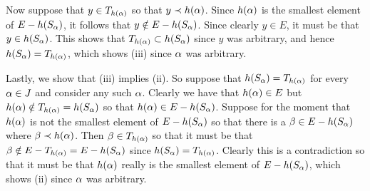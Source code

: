 {{    Now suppose that $y \in T_{h(\alpha)}$ so that $y \prec h(\alpha)$.
    Since $h(\alpha)$ is the smallest element of $E - h(S_\alpha)$, it follows that $y \notin E - h(S_\alpha)$.
    Since clearly $y \in E$, it must be that $y \in h(S_\alpha)$.
    This shows that $T_{h(\alpha)} \subset h(S_\alpha)$ since $y$ was arbitrary, and hence $h(S_\alpha) = T_{h(\alpha)}$, which shows (iii) since $\alpha$ was arbitrary.

    Lastly, we show that (iii) implies (ii).
    So suppose that $h(S_\alpha) = T_{h(\alpha)}$ for every $\alpha \in J$ and consider any such $\alpha$.
    Clearly we have that $h(\alpha) \in E$ but $h(\alpha) \notin T_{h(\alpha)} = h(S_\alpha)$ so that $h(\alpha) \in E - h(S_\alpha)$.
    Suppose for the moment that $h(\alpha)$ is not the smallest element of $E - h(S_\alpha)$ so that there is a $\beta \in E - h(S_\alpha)$ where $\beta \prec h(\alpha)$.
    Then $\beta \in T_{h(\alpha)}$ so that it must be that $\beta \notin E - T_{h(\alpha)} = E - h(S_\alpha)$ since $h(S_\alpha) = T_{h(\alpha)}$.
    Clearly this is a contradiction so that it must be that $h(\alpha)$ really is the smallest element of $E - h(S_\alpha)$, which shows (ii) since $\alpha$ was arbitrary.
  }
}

